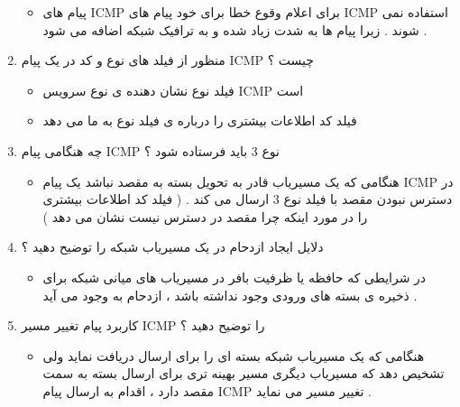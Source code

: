 \documentclass{article}
\begin{document}
\begin{enumerate}
\begin{tcolorbox}
\begin{itemize}
	\item پیام های ICMP
	برای اعلام وقوع خطا برای خود پیام های ICMP
	استفاده نمی شوند . زیرا پیام ها به شدت زیاد شده و به ترافیک شبکه اضافه می شود .
\end{itemize}
\end{tcolorbox}

\item منظور از فیلد های نوع و کد در یک پیام ICMP چیست ؟

\begin{tcolorbox}
\begin{itemize}
	\item فیلد نوع نشان دهنده ی نوع سرویس ICMP است
	\item فیلد کد اطلاعات بیشتری را درباره ی فیلد نوع به ما می دهد
\end{itemize}
\end{tcolorbox}

\item چه هنگامی پیام ICMP نوع 3 باید فرستاده شود ؟

\begin{tcolorbox}
\begin{itemize}
	\item هنگامی که یک مسیریاب قادر به تحویل بسته به مقصد نباشد
	یک پیام ICMP در دسترس نبودن مقصد با فیلد نوع 3 ارسال می کند . ( فیلد کد اطلاعات بیشتری را در مورد اینکه چرا مقصد در دسترس نیست نشان می دهد )
\end{itemize}
\end{tcolorbox}

\item دلایل ایجاد ازدحام در یک مسیریاب شبکه را توضیح دهید ؟

\begin{tcolorbox}
\begin{itemize}
	\item در شرایطی که حافظه یا ظرفیت بافر در مسیریاب های میانی شبکه برای ذخیره ی بسته های ورودی وجود نداشته باشد ، ازدحام به وجود می آید .
\end{itemize}
\end{tcolorbox}


\newpage

\item کاربرد پیام تغییر مسیر ICMP را توضیح دهید ؟

\begin{tcolorbox}
\begin{itemize}
	\item هنگامی که یک مسیریاب شبکه بسته ای را برای ارسال دریافت نماید ولی تشخیص دهد که مسیریاب دیگری مسیر بهینه تری برای ارسال بسته به سمت مقصد دارد ، 
	اقدام به ارسال پیام ICMP تغییر مسیر می نماید .
\end{itemize}
\end{tcolorbox}


\end{enumerate}
\end{document}
